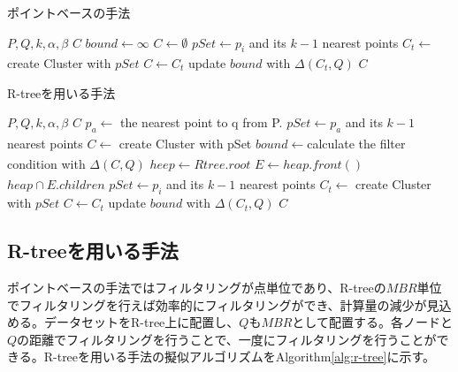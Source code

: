 \documentclass{deimj}
\begin{document}
\begin{algorithm}                      
\caption{ポイントベースの手法}         
\label{alg:point}
\begin{algorithmic}[1]                  
\renewcommand{\algorithmicrequire}{\textbf{Input:}}
\renewcommand{\algorithmicensure}{\textbf{Output:}}
\REQUIRE $P,Q,k,\alpha, \beta$
\ENSURE $C$
\STATE $bound \xleftarrow[]{} \infty$
\STATE $C \xleftarrow[]{} \emptyset$
\STATE $pSet \xleftarrow{} p_i$ and its $k-1$ nearest points
\STATE $C_t \xleftarrow{}$ create Cluster with $pSet$
\STATE $C \xleftarrow{} C_t$
\STATE update $bound$ with $\Delta(C_t,Q)$
\ENDIF
\ENDIF
\ENDFOR
\RETURN $C$
\end{algorithmic}
\end{algorithm}

\begin{algorithm}                      
\caption{R-treeを用いる手法}         
\label{alg:r-tree}
\begin{algorithmic}[1]                  
\renewcommand{\algorithmicrequire}{\textbf{Input:}}
\renewcommand{\algorithmicensure}{\textbf{Output:}}
\REQUIRE $P,Q,k,\alpha, \beta$
\ENSURE $C$
\STATE $p_a \xleftarrow[]{}$ the nearest point to q from P.
\STATE $pSet \xleftarrow{} p_a$ and its $k-1$ nearest points
\STATE $C \xleftarrow[]{}$ create Cluster with pSet
\STATE $bound \xleftarrow[]{} $calculate the filter condition with $\Delta(C,Q)$
\STATE $heep \xleftarrow[]{} Rtree.root$
\STATE $E \xleftarrow[]{}heap.front()$
\STATE $heap \cap E.children$
\ENDIF
{}
\STATE $pSet \xleftarrow{} p_i$ and its $k-1$ nearest points
\STATE $C_t \xleftarrow{}$ create Cluster with $pSet$
\STATE $C \xleftarrow{} C_t$
\STATE update $bound$ with $\Delta(C_t,Q)$
\ENDIF
\ENDIF
\ENDFOR
\ENDIF
\ENDIF
\ENDWHILE
\RETURN $C$
\end{algorithmic}
\end{algorithm}

\subsection{R-treeを用いる手法}
ポイントベースの手法ではフィルタリングが点単位であり、R-treeの$MBR$単位でフィルタリングを行えば効率的にフィルタリングができ、計算量の減少が見込める。データセットをR-tree上に配置し、$Q$も$MBR$として配置する。各ノードと$Q$の距離でフィルタリングを行うことで、一度にフィルタリングを行うことができる。R-treeを用いる手法の擬似アルゴリズムをAlgorithm\ref{alg:r-tree}に示す。
\end{document}
